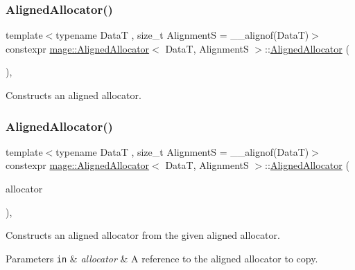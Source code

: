 \subsubsection{\texorpdfstring{Aligned\+Allocator()}{AlignedAllocator()}\hspace{0.1cm}{\footnotesize\ttfamily [1/4]}}
{\footnotesize\ttfamily template$<$typename DataT , size\+\_\+t AlignmentS = \+\_\+\+\_\+alignof(\+Data\+T)$>$ \\
constexpr \hyperlink{structmage_1_1_aligned_allocator}{mage\+::\+Aligned\+Allocator}$<$ DataT, AlignmentS $>$\+::\hyperlink{structmage_1_1_aligned_allocator}{Aligned\+Allocator} (\begin{DoxyParamCaption}{ }\end{DoxyParamCaption})\hspace{0.3cm}{\ttfamily [default]}, {\ttfamily [noexcept]}}

Constructs an aligned allocator. \hypertarget{structmage_1_1_aligned_allocator_ad5ccaa890d899f8876253a5bfd83a1ba}{}\label{structmage_1_1_aligned_allocator_ad5ccaa890d899f8876253a5bfd83a1ba} 
\subsubsection{\texorpdfstring{Aligned\+Allocator()}{AlignedAllocator()}\hspace{0.1cm}{\footnotesize\ttfamily [2/4]}}
{\footnotesize\ttfamily template$<$typename DataT , size\+\_\+t AlignmentS = \+\_\+\+\_\+alignof(\+Data\+T)$>$ \\
constexpr \hyperlink{structmage_1_1_aligned_allocator}{mage\+::\+Aligned\+Allocator}$<$ DataT, AlignmentS $>$\+::\hyperlink{structmage_1_1_aligned_allocator}{Aligned\+Allocator} (\begin{DoxyParamCaption}\item[{const \hyperlink{structmage_1_1_aligned_allocator}{Aligned\+Allocator}$<$ DataT, AlignmentS $>$ \&}]{allocator }\end{DoxyParamCaption})\hspace{0.3cm}{\ttfamily [default]}, {\ttfamily [noexcept]}}

Constructs an aligned allocator from the given aligned allocator.


\begin{DoxyParams}[1]{Parameters}
\mbox{\tt in}  & {\em allocator} & A reference to the aligned allocator to copy. \\
\hline
\end{DoxyParams}
\hypertarget{structmage_1_1_aligned_allocator_a5913d9165132c04473673dd0214e8817}{}\label{structmage_1_1_aligned_allocator_a5913d9165132c04473673dd0214e8817} 
